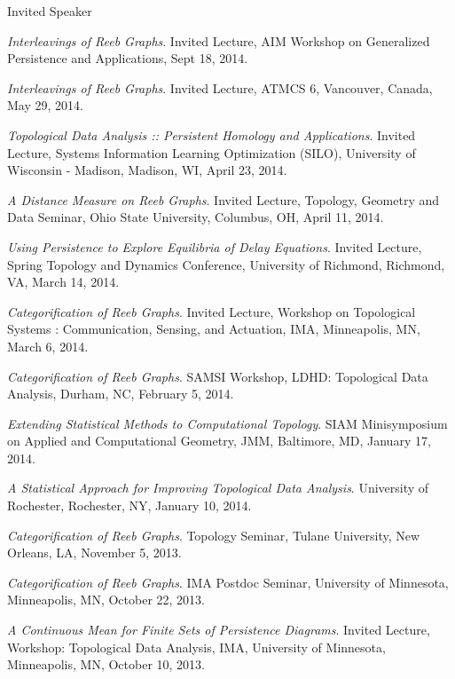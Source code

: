 \documentclass{resume} %
\begin{document}
\begin{rSection}{Invited Speaker}
\begin{etaremune}
\item\emph{Interleavings of Reeb Graphs}. Invited Lecture, AIM Workshop on Generalized Persistence and Applications, Sept 18, 2014. 

\item\emph{Interleavings of Reeb Graphs}. Invited Lecture, ATMCS 6, Vancouver, Canada, May 29, 2014. 

\item\emph{Topological Data Analysis :: Persistent Homology and Applications}. Invited Lecture, Systems Information Learning Optimization (SILO), University of Wisconsin - Madison, Madison, WI, April 23, 2014. 

\item\emph{A Distance Measure on Reeb Graphs}. Invited Lecture, Topology, Geometry and Data Seminar, Ohio State University, Columbus, OH, April 11, 2014. 

\item\emph{Using Persistence to Explore Equilibria of Delay Equations}. Invited Lecture, Spring Topology and Dynamics Conference, University of Richmond, Richmond, VA, March 14, 2014. 

\item\emph{Categorification of Reeb Graphs}. Invited Lecture, Workshop on Topological Systems : Communication, Sensing, and Actuation, IMA, Minneapolis, MN, March 6, 2014. 

\item\emph{Categorification of Reeb Graphs}. SAMSI Workshop, LDHD: Topological Data Analysis, Durham, NC, February 5, 2014. 

\item\emph{Extending Statistical Methods to Computational Topology}. SIAM Minisymposium on Applied and Computational Geometry, JMM, Baltimore, MD, January 17, 2014. 

\item\emph{A Statistical Approach for Improving Topological Data Analysis}. University of Rochester, Rochester, NY, January 10, 2014. 

\item\emph{Categorification of Reeb Graphs}. Topology Seminar, Tulane University, New Orleans, LA, November 5, 2013. 

\item\emph{Categorification of Reeb Graphs}. IMA Postdoc Seminar, University of Minnesota, Minneapolis, MN, October 22, 2013. 

\item\emph{A Continuous Mean for Finite Sets of Persistence Diagrams}. Invited Lecture, Workshop: Topological Data Analysis, IMA, University of Minnesota, Minneapolis, MN, October 10, 2013. 


\end{etaremune}
\end{rSection}
\end{document}
